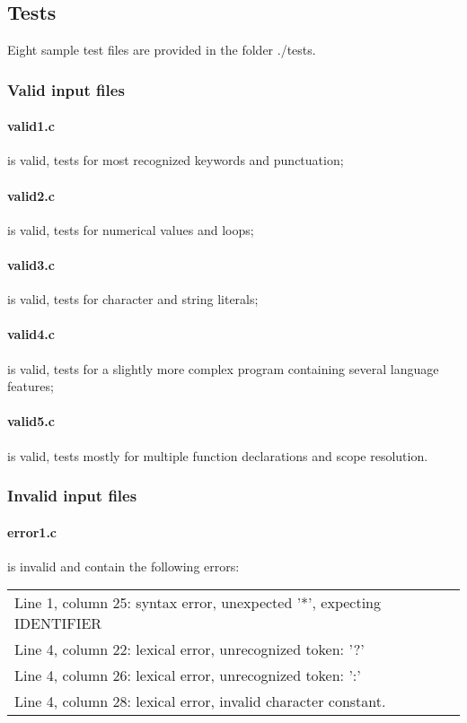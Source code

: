 
\subsection{Tests}
Eight sample test files are provided in the folder ./tests.

\subsubsection{Valid input files}
\paragraph{valid1.c} is valid, tests for most recognized keywords and punctuation;
\paragraph{valid2.c} is valid, tests for numerical values and loops;
\paragraph{valid3.c} is valid, tests for character and string literals;
\paragraph{valid4.c} is valid, tests for a slightly more complex program containing several language features;
\paragraph{valid5.c} is valid, tests mostly for multiple function declarations and scope resolution.

\subsubsection{Invalid input files}
\paragraph{error1.c} is invalid and contain the following errors:

\begin{tabular}{l}
Line 1, column 25: syntax error, unexpected '*', expecting IDENTIFIER \\
Line 4, column 22: lexical error, unrecognized token: '?' \\
Line 4, column 26: lexical error, unrecognized token: ':' \\
Line 4, column 28: lexical error, invalid character constant. \\
\end{tabular}

